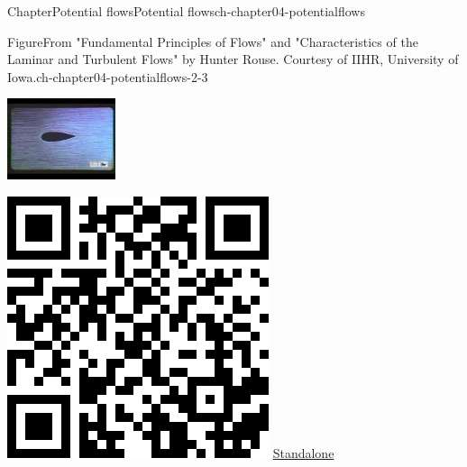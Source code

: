 \documentclass[oneside,10pt,]{book}
\numberwithin{equation}{section}
\begin{document}
\begin{chapterptx}{Chapter}{Potential flows}{}{Potential flows}{}{}{ch-chapter04-potentialflows}
\begin{introduction}{}
\begin{figureptx}{Figure}{From "Fundamental Principles of Flows" and "Characteristics of the Laminar and Turbulent Flows" by Hunter Rouse. Courtesy of IIHR, University of Iowa.}{ch-chapter04-potentialflows-2-3}{}
\begin{sidebyside}{2}{0.075}{0.075}{0.17}
\begin{sbspanel}{0.47}
\noindent\includegraphics[width=\linewidth]{generated/youtube/ch-chapter04-potentialflows-2-3-2.jpg}
\end{sbspanel}%
\begin{sbspanel}{0.21}%
\noindent\includegraphics[width=\linewidth]{generated/qrcode/ch-chapter04-potentialflows-2-3-2.png}
\href{https://trinh.github.io/BathMAFluids/ch-chapter04-potentialflows-2-3-2.html}{Standalone}%
\end{sbspanel}%

\end{sidebyside}
\end{figureptx}
\end{introduction}
\end{chapterptx}
\end{document}
